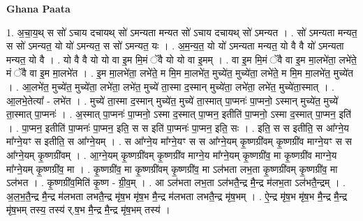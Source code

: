 \documentclass[17pt]{extarticle}
\begin{document}
\textbf{Ghana Paata } \newline

1. अ॒चा॒य॒थ् स सो॑ ऽचाय दचायथ् सो॑ ऽमन्यता मन्यत सो॑ ऽचाय दचायथ् सो॑ ऽमन्यत । . सो॑ ऽमन्यता मन्यत॒ स सो॑ ऽमन्यत॒ यो यो॑ ऽमन्यत॒ स सो॑ ऽमन्यत॒ यः । . अ॒म॒न्य॒त॒ यो यो॑ ऽमन्यता मन्यत॒ यो वै वै यो॑ ऽमन्यता मन्यत॒ यो वै । . यो वै वै यो यो वा इ॒म मि॒मं ॅवै यो यो वा इ॒मम् । . वा इ॒म मि॒मं ॅवै वा इ॒म मा॒लभे॑ता॒ लभे॑ते॒ मं ॅवै वा इ॒म मा॒लभे॑त । . इ॒म मा॒लभे॑ता॒ लभे॑ते॒ म मि॒म मा॒लभे॑त॒ मुच्ये॑त॒ मुच्ये॑ता॒ लभे॑ते॒ म मि॒म मा॒लभे॑त॒ मुच्ये॑त । . आ॒लभे॑त॒ मुच्ये॑त॒ मुच्ये॑ता॒ लभे॑ता॒ लभे॑त॒ मुच्ये॑ ता॒स्मा द॒स्मान् मुच्ये॑ता॒ लभे॑ता॒ लभे॑त॒ मुच्ये॑ता॒स्मात् । . आ॒लभे॒तेत्या᳚ - लभे॑त । . मुच्ये॑ ता॒स्मा द॒स्मान् मुच्ये॑त॒ मुच्ये॑ ता॒स्मात् पा॒प्मनः॑ पा॒प्मनो॒ ऽस्मान् मुच्ये॑त॒ मुच्ये॑ ता॒स्मात् पा॒प्मनः॑ । . अ॒स्मात् पा॒प्मनः॑ पा॒प्मनो॒ ऽस्मा द॒स्मात् पा॒प्मन॒ इतीति॑ पा॒प्मनो॒ ऽस्मा द॒स्मात् पा॒प्मन॒ इति॑ । . पा॒प्मन॒ इतीति॑ पा॒प्मनः॑ पा॒प्मन॒ इति॒ स स इति॑ पा॒प्मनः॑ पा॒प्मन॒ इति॒ सः । . इति॒ स स इतीति॒ स आ᳚ग्ने॒य मा᳚ग्ने॒यꣳ स इतीति॒ स आ᳚ग्ने॒यम् । . स आ᳚ग्ने॒य मा᳚ग्ने॒यꣳ स स आ᳚ग्ने॒यम् कृ॒ष्णग्री॑वम् कृ॒ष्णग्री॑व माग्ने॒यꣳ स स आ᳚ग्ने॒यम् कृ॒ष्णग्री॑वम् । . आ॒ग्ने॒यम् कृ॒ष्णग्री॑वम् कृ॒ष्णग्री॑व माग्ने॒य मा᳚ग्ने॒यम् कृ॒ष्णग्री॑व॒ मा कृ॒ष्णग्री॑व माग्ने॒य मा᳚ग्ने॒यम् कृ॒ष्णग्री॑व॒ मा । . कृ॒ष्णग्री॑व॒ मा कृ॒ष्णग्री॑वम् कृ॒ष्णग्री॑व॒ मा ऽल॑भता लभ॒ता कृ॒ष्णग्री॑वम् कृ॒ष्णग्री॑व॒ मा ऽल॑भत । . कृ॒ष्णग्री॑व॒मिति॑ कृ॒ष्ण - ग्री॒व॒म् । . आ ऽल॑भता लभ॒ता ऽल॑भतै॒न्द्र मै॒न्द्र म॑लभ॒ता ऽल॑भतै॒न्द्रम् । . अ॒ल॒भ॒तै॒न्द्र मै॒न्द्र म॑लभता लभतै॒न्द्र मृ॑ष॒भ मृ॑ष॒भ मै॒न्द्र म॑लभता लभतै॒न्द्र मृ॑ष॒भम् । . ऐ॒न्द्र मृ॑ष॒भ मृ॑ष॒भ मै॒न्द्र मै॒न्द्र मृ॑ष॒भम् तस्य॒ तस्य॑ र्.ष॒भ मै॒न्द्र मै॒न्द्र मृ॑ष॒भम् तस्य॑ । \newline
\end{document}
